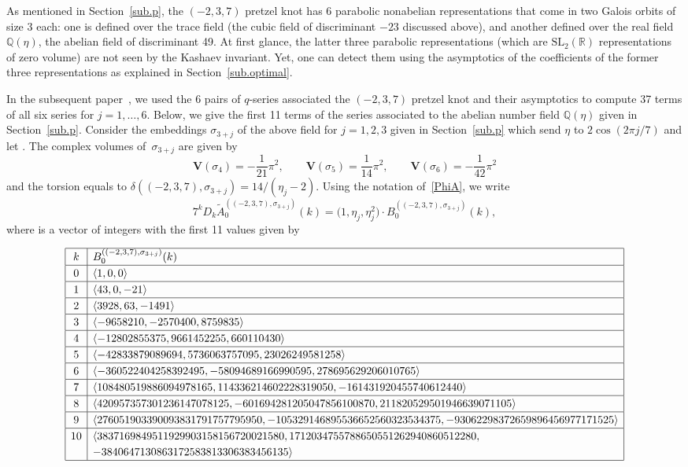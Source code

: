 \documentclass[pdftex]{sigma}
\numberwithin{equation}{section}
\def\BZ{\mathbb Z}
\def\BQ{\mathbb Q}
\def\BR{\mathbb R}
\def\la{\langle}
\def\ra{\rangle}
\def\wt{\widetilde}
\def\SL{\mathrm{SL}}
\def\s{\sigma}
\def\V{\mathbf V}
\def\tiA{\wt A}
\begin{document}
As mentioned in Section~\ref{sub.p}, the $(-2,3,7)$ pretzel knot
has 6 parabolic nonabelian representations that come in two Galois orbits
of size 3 each: one is defined over the trace field (the cubic field of
discriminant $-23$ discussed above), and another defined over the real
field $\BQ(\eta)$, the abelian field of discriminant 49. At first glance,
the latter three parabolic representations (which are $\SL_2(\BR)$
representations of zero volume) are not seen by the Kashaev invariant. Yet,
one can detect them using the asymptotics of the coefficients of the former
three representations as explained in Section~\ref{sub.optimal}.

In the subsequent paper~\cite{GZ:qseries}, we used the 6 pairs of $q$-series
associated the $(-2,3,7)$ pretzel knot and their asymptotics to compute 37
terms of all six series \smash{$\Phi^{((-2,3,7),\s_j)}_{0}(h)$} for $j=1,\dots,6$.
Below, we give the first 11 terms of the series associated to the abelian
number field $\BQ(\eta)$ given in Section~\ref{sub.p}.
Consider the embeddings $\s_{3+j}$ of the above field for $j=1,2,3$
given in Section~\ref{sub.p} which send $\eta$ to $2\cos(2\pi j/7)$
and let
\smash{$C^{((-2,3,7),\s_{3+j})}_0 = \sqrt{(\eta_j-2)/14}$}. The complex volumes
of~$\s_{3+j}$ are given by
\[
\V(\s_4)= -\frac{1}{21} \pi^2, \qquad \V(\s_5)= \frac{1}{14} \pi^2, \qquad
\V(\s_6)= -\frac{1}{42} \pi^2
\]
and the torsion equals to $\delta((-2,3,7), \s_{3+j})=14/(\eta_j-2)$.
Using the notation of~\eqref{PhiA}, we write
\[
7^k  D_k  \tiA^{((-2,3,7),\s_{3+j})}_{0}(k)
= \big(1,\eta_j,\eta_j^2\big)\cdot B^{((-2,3,7),\s_{3+j})}_{0}(k),
\]
where \smash{$B^{((-2,3,7),\s_{3+j})}_{0}(k) \in \BZ^3$} is a vector of integers with
the first 11 values given by

{\tiny
$$\renewcommand{\arraystretch}{1.2}
\begin{array}{|c|l|} \hline
k & B^{((-2,3,7),\s_{3+j})}_{0}(k) \\ \hline
0 & \la 1, 0, 0\ra
\\ \hline
1 & \la 43, 0, -21\ra
\\ \hline
2 & \la 3928, 63, -1491\ra
\\ \hline
3 & \la -9658210, -2570400, 8759835\ra
\\ \hline
4 & \la -12802855375, 9661452255, 660110430\ra
\\ \hline
5 & \la -42833879089694, 5736063757095, 23026249581258\ra
\\ \hline
6 & \la -360522404258392495, -58094689166990595, 278695629206010765\ra
\\ \hline
7 & \la 108480519886094978165, 114336214602228319050, -161431920455740612440\ra
\\ \hline
8 & \la 420957357301236147078125, -601694281205047856100870, 211820529501946639071105\ra
\\ \hline
9 & \la 276051903390093831791757795950, -105329146895536652560323534375, -93062298372659896456977171525\ra
\\ \hline
10 & \la 3837169849511929903158156720021580, 1712034755788650551262940860512280,
\\ &
-3840647130863172583813306383456135
\ra
\\ \hline
\end{array}
$$
}
\end{document}

